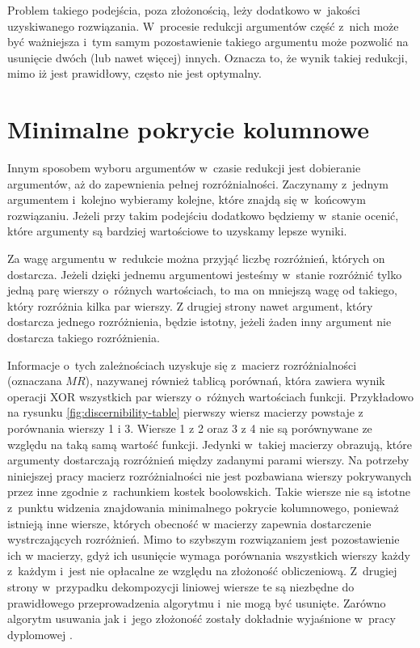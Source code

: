 Problem takiego podejścia,
poza złożonością,
leży dodatkowo w~jakości uzyskiwanego rozwiązania.
W~procesie redukcji argumentów część z~nich może być ważniejsza
i~tym samym pozostawienie takiego argumentu może pozwolić na usunięcie dwóch (lub nawet więcej) innych.
Oznacza to,
że wynik takiej redukcji,
mimo iż jest prawidłowy,
często nie jest optymalny.

\section{Minimalne pokrycie kolumnowe}

Innym sposobem wyboru argumentów w~czasie redukcji jest dobieranie argumentów,
aż do zapewnienia pełnej rozróżnialności.
Zaczynamy z~jednym argumentem i~kolejno wybieramy kolejne,
które znajdą się w~końcowym rozwiązaniu.
Jeżeli przy takim podejściu dodatkowo będziemy w~stanie ocenić,
które argumenty są bardziej wartościowe to uzyskamy lepsze wyniki.

Za wagę argumentu w~redukcie można przyjąć liczbę rozróżnień,
których on dostarcza.
Jeżeli dzięki jednemu argumentowi jesteśmy w~stanie rozróżnić tylko jedną parę wierszy o~różnych wartościach,
to ma on mniejszą wagę od takiego,
który rozróżnia kilka par wierszy.
Z drugiej strony nawet argument,
który dostarcza jednego rozróżnienia,
będzie istotny,
jeżeli żaden inny argument nie dostarcza takiego rozróżnienia.

Informacje o~tych zależnościach uzyskuje się z~macierz rozróżnialności (oznaczana $MR$), nazywanej również tablicą porównań,
która zawiera wynik operacji XOR wszystkich par wierszy o~różnych wartościach funkcji.
Przykładowo na rysunku \ref{fig:discernibility-table} pierwszy wiersz macierzy powstaje z porównania wierszy 1 i 3.
Wiersze 1 z 2 oraz 3 z 4 nie są porównywane ze względu na taką samą wartość funkcji.
Jedynki w~takiej macierzy obrazują,
które argumenty dostarczają rozróżnień między zadanymi parami wierszy.
Na potrzeby niniejszej pracy macierz rozróżnialności nie jest pozbawiana wierszy pokrywanych przez inne zgodnie z~rachunkiem kostek boolowskich.
Takie wiersze nie są istotne z~punktu widzenia znajdowania minimalnego pokrycie kolumnowego,
ponieważ istnieją inne wiersze, których obecność w macierzy zapewnia dostarczenie wystrczających rozróżnień.
Mimo to szybszym rozwiązaniem jest pozostawienie ich w macierzy,
gdyż ich usunięcie wymaga porównania wszystkich wierszy każdy z~każdym
i~jest nie opłacalne ze względu na złożoność obliczeniową.
Z~drugiej strony w~przypadku dekompozycji liniowej wiersze te są niezbędne do prawidłowego przeprowadzenia algorytmu i~nie mogą być usunięte.
Zarówno algorytm usuwania jak i~jego złożoność zostały dokładnie wyjaśnione w~pracy dyplomowej \cite{inzynierka}.

